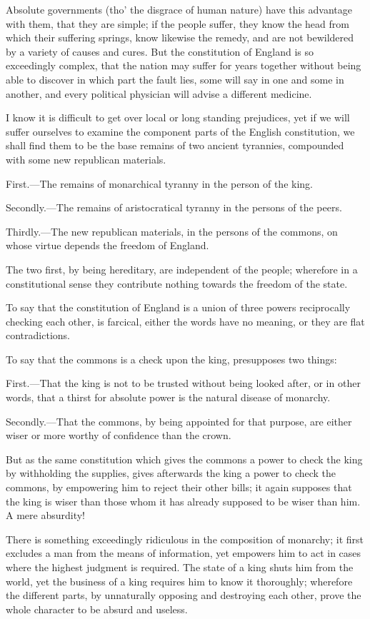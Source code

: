 \documentclass[12pt,oneside]{memoir}
\begin{document}
Absolute governments (tho' the disgrace of human nature) have this advantage with them, that they are simple; if the people suffer, they know the head from which their suffering springs, know likewise the remedy, and are not bewildered by a variety of causes and cures. But the constitution of England is so exceedingly complex, that the nation may suffer for years together without being able to discover in which part the fault lies, some will say in one and some in another, and every political physician will advise a different medicine.

I know it is difficult to get over local or long standing prejudices, yet if we will suffer ourselves to examine the component parts of the English constitution, we shall find them to be the base remains of two ancient tyrannies, compounded with some new republican materials.

First.---The remains of monarchical tyranny in the person of the king.

Secondly.---The remains of aristocratical tyranny in the persons of the peers.

Thirdly.---The new republican materials, in the persons of the commons, on whose virtue depends the freedom of England.

The two first, by being hereditary, are independent of the people; wherefore in a constitutional sense they contribute nothing towards the freedom of the state.

To say that the constitution of England is a union of three powers 
reciprocally checking each other, is farcical, either the words have no meaning, or they are flat contradictions.

To say that the commons is a check upon the king, presupposes two things:

First.---That the king is not to be trusted without being looked after, or in other words, that a thirst for absolute power is the natural disease of monarchy.

Secondly.---That the commons, by being appointed for that purpose, are either wiser or more worthy of confidence than the crown.

But as the same constitution which gives the commons a power to check the king by withholding the supplies, gives afterwards the king a power to check the commons, by empowering him to reject their other bills; it again supposes that the king is wiser than those 
whom it has already supposed to be wiser than him. A mere absurdity!

There is something exceedingly ridiculous in the composition of monarchy; it first excludes a man from the means of information, yet empowers him to act in cases where the highest judgment is required. The state of a king shuts him from the world, yet the business of a king requires him to know it thoroughly; wherefore the different parts, by unnaturally opposing and destroying each other, prove the whole character to be absurd and useless.
\end{document}
